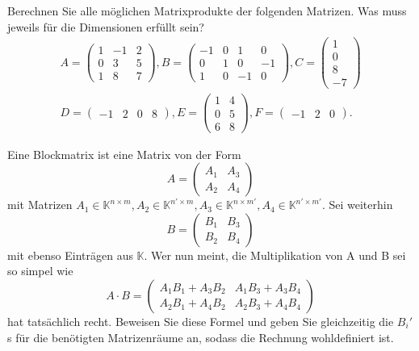 \begin{Problem}
	\begin{parts}
		\item  Berechnen Sie alle möglichen Matrixprodukte der folgenden Matrizen. Was muss jeweils für die Dimensionen erfüllt sein?
	 \begin{gather*}
		 A=\begin{pmatrix} 1 & -1 & 2 \\ 0 & 3 & 5 \\ 1 & 8 & 7 \end{pmatrix}, B=\begin{pmatrix} -1 & 0 & 1 & 0 \\ 0 & 1 & 0 & -1 \\ 1 & 0 & -1 & 0 \end{pmatrix} ,C=\begin{pmatrix} 1 \\ 0 \\ 8 \\ -7 \end{pmatrix}\\
		 D=\begin{pmatrix} -1 & 2 & 0 & 8 \end{pmatrix}, E=\begin{pmatrix} 1 & 4 \\ 0 & 5 \\ 6 & 8 \end{pmatrix} , F=\begin{pmatrix} -1 & 2 & 0 \end{pmatrix} .
	 \end{gather*}
 \item Eine Blockmatrix ist eine Matrix von der Form
	 \[
		 A=\begin{pmatrix} A_1 & A_3 \\ A_2 & A_4 \end{pmatrix} \] 
		 mit Matrizen $A_1\in \mathbb{K}^{n \times m}, A_2\in \mathbb{K}^{n'\times m}, A_3\in \mathbb{K}^{n \times m'}, A_4\in\mathbb{K}^{n'\times m'}$. Sei weiterhin
		 \[
			 B=\begin{pmatrix} B_1 & B_3 \\ B_2 & B_4 \end{pmatrix} \] 
			 mit ebenso Einträgen aus $\mathbb{K}$. Wer nun meint, die Multiplikation von A und B sei so simpel wie
			 \[
				 A\cdot B=\begin{pmatrix} A_1B_1+A_3B_2 & A_1B_3+A_3B_4 \\ A_2B_1+A_4B_2 & A_2B_3+A_4B_4 \end{pmatrix} \] 
hat tatsächlich recht. Beweisen Sie diese Formel und geben Sie gleichzeitig die $B_i'$s für die benötigten Matrizenräume an, sodass die Rechnung wohldefiniert ist.
 \end{parts}
\end{Problem}
